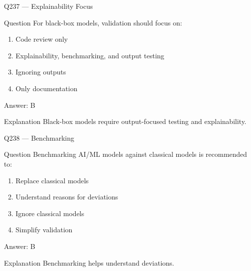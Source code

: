 \documentclass[aspectratio=169,8pt]{beamer}
\begin{document}
								\begin{frame}{Q237 --- Explainability Focus}
									\begin{block}{Question}
										For black-box models, validation should focus on:
										\begin{enumerate}
											\item Code review only
											\item Explainability, benchmarking, and output testing
											\item Ignoring outputs
											\item Only documentation
										\end{enumerate}
									\end{block}
									\begin{exampleblock}{Answer: B}\end{exampleblock}
									\begin{block}{Explanation}
										Black-box models require output-focused testing and explainability.
									\end{block}
								\end{frame}
								
								\begin{frame}{Q238 --- Benchmarking}
									\begin{block}{Question}
										Benchmarking AI/ML models against classical models is recommended to:
										\begin{enumerate}
											\item Replace classical models
											\item Understand reasons for deviations
											\item Ignore classical models
											\item Simplify validation
										\end{enumerate}
									\end{block}
									\begin{exampleblock}{Answer: B}\end{exampleblock}
									\begin{block}{Explanation}
										Benchmarking helps understand deviations.
									\end{block}
								\end{frame}
								
\end{document}

